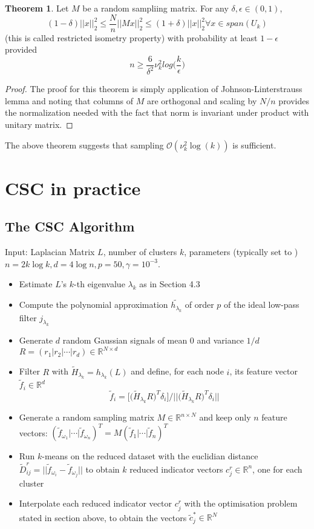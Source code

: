\documentclass[10pt,a4paper,twoside]{report}
\theoremstyle{definition}
\newtheorem{theorem}{Theorem}
\newcommand{\norm}[1]{\lvert\lvert {#1} \rvert\rvert}
\begin{document}
	\begin{theorem}
		Let $M$ be a random sampliing matrix. For any $\delta, \epsilon \in (0,1)$, $$(1-\delta)\norm{x}_2^2 \le \frac{N}{n}\norm{Mx}_2^2\le(1+\delta)\norm{x}_2^2 \forall x \in span(U_k)$$ (this is called restricted isometry property) with probability at least $1-\epsilon$ provided $$ n\ge \frac{6}{\delta^2}\nu_k^2 log\bigg(\frac{k}{\epsilon}\bigg) $$
	\end{theorem}
	\begin{proof}
		The proof for this theorem is simply application of Johnson-Linterstrauss lemma and noting that columns of $M$ are orthogonal and scaling by $N/n$ provides the normalization needed with the fact that norm is invariant under product with unitary matrix. 
	\end{proof}

	The above theorem suggests that sampling $\mathcal{O}(\nu_k^2\log(k))$ is sufficient.

	\chapter{CSC in practice}
	\section{The CSC Algorithm}
	
	Input: Laplacian Matrix $L$, number of clusters $k$, parameters (typically set to ) $n=2k \log k, d=4\log n, p=50,\gamma=10^{-3}$.
	\begin{itemize}
		\item Estimate $L$'s $k$-th eigenvalue $\lambda_k$ as in Section 4.3
		\item Compute the polynomial approximation $\tilde{h_{\lambda_k}}$ of order $p$ of the ideal low-pass filter $j_{\lambda_k}$
		\item Generate $d$ random Gaussian signals of mean 0 and variance $1/d$ $R=(r_1\lvert r_2\lvert \cdots \lvert r_d) \in \mathbb{R}^{N \times d}$
		\item Filter $R$ with $\tilde{H}_{\lambda_k} = h_{\lambda_k}(L)$ and define, for each node $i$, its feature vector $\tilde{f}_i \in \mathbb{R}^d$ $$ \tilde{f}_i = \bigg[ \bigg( \tilde{H}_{\lambda_k}R \bigg)^T \delta_i \bigg]  \bigg/ \biggl|\biggl| \bigg( \tilde{H}_{\lambda_k}R \bigg)^T \delta_i\biggr|\biggr| $$
		\item Generate a random sampling matrix $M \in \mathbb{R}^{n \times N}$ and keep only $n$ feature vectors: $(\tilde{f}_{\omega_1}|\cdots|\tilde{f}_{\omega_n})^T = M(\tilde{f}_{1}|\cdots|\tilde{f}_{n})^T$
		\item Run $k$-means on the reduced dataset with the euclidian distance $\tilde{D}_{ij}^r = \norm{\tilde{f}_{\omega_i}-\tilde{f}_{\omega_j}}$ to obtain $k$ reduced indicator vectors $c_j^r \in \mathbb{R}^n$, one for each cluster
		\item Interpolate each reduced indicator vector $c_j^r$ with the optimisation problem stated in section above, to obtain the vectors $\tilde{c}_j^* \in \mathbb{R}^N$ 
	\end{itemize}
	
\end{document}
